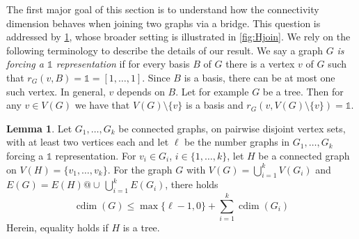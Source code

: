 \documentclass[letterpaper,12pt,headings=normal,parskip=half]{scrartcl}
\DeclareMathOperator{\cdim}{cdim}
\theoremstyle{definition}
\newtheorem{lemma}[theorem]{Lemma}
\begin{document}
The first major goal of this section is to understand how the connectivity dimension behaves when joining two graphs via a bridge. 
This question is addressed by \cref{lem:cdimHjoin}, whose broader setting is illustrated in \cref{fig:Hjoin}. 
We rely on the following terminology to describe the details of our result. 
We say a graph $G$ \emph{is forcing a $\mathds{1}$ representation} if for every basis $B$ of $G$ there is a vertex $v$ of $G$ such that $r_G(v,B)=\mathds{1}=[1,\ldots,1]$.
Since $B$ is a basis, there can be at most one such vertex.
In general, $v$ depends on $B$.
Let for example $G$ be a tree. 
Then for any $v\in V(G)$ we have that $V(G)\setminus\{v\}$ is a basis and $r_G(v,V(G)\setminus\{v\})=\mathds{1}$.

\begin{lemma}\label{lem:cdimHjoin}
    Let $G_1,\ldots,G_k$ be connected graphs, on pairwise disjoint vertex sets, with at least two vertices each and let $\ell$ be the number graphs in $G_1,\ldots,G_k$ forcing a $\mathds{1}$ representation. 
    For $v_i\in G_i$, $i\in\{1,\ldots,k\}$, let $H$ be a connected graph on $V(H)=\{v_1,\ldots,v_k\}$. For the graph $G$ with $V(G)=\bigcup_{i=1}^k V(G_i)$ and $E(G)=E(H)@\cup\,\bigcup_{i=1}^kE(G_i)$, there holds
    \begin{equation*}
        \cdim(G)\leq\max\{\ell-1,0\}+\sum_{i=1}^k \cdim(G_i)
    \end{equation*}
    Herein, equality holds if $H$ is a tree.
\end{lemma}%
\end{document}

